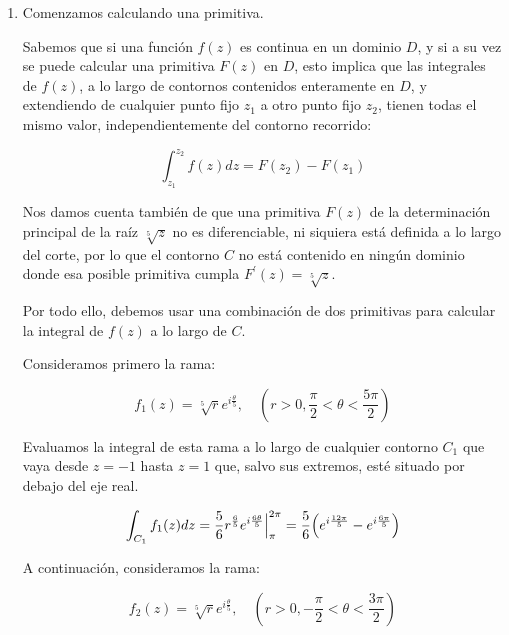 \begin{enumerate}
    \vspace{20px}
    \item Comenzamos calculando una primitiva.

    Sabemos que si una función $f(z)$ es continua en un dominio $D$, y si a su vez se puede calcular una primitiva $F(z)$ en $D$,
    esto implica que las integrales de $f(z)$, a lo largo de contornos contenidos enteramente en $D$, y extendiendo de cualquier punto
    fijo $z_1$ a otro punto fijo $z_2$, tienen todas el mismo valor, independientemente del contorno recorrido:

    \begin{equation*}
        \int_{z_1}^{z_2} f(z)dz = F(z_2) - F(z_1)
    \end{equation*}

    Nos damos cuenta también de que una primitiva $F(z)$ de la determinación principal de la raíz $\sqrt[5]{z}$ no es diferenciable,
    ni siquiera está definida a lo largo del corte, por lo que el contorno $C$ no está contenido en ningún dominio donde
    esa posible primitiva cumpla $F^\prime(z) = \sqrt[5]{z}$.

    Por todo ello, debemos usar una combinación de dos primitivas para calcular la integral de $f(z)$ a lo largo de $C$.

    Consideramos primero la rama:

    \begin{equation*}
        f_1(z) = \sqrt[5]{r} e^{i\frac{\theta}{5}}, \hspace{12pt} (r> 0, \frac{\pi}{2} < \theta < \frac{5\pi}{2})
    \end{equation*}

    Evaluamos la integral de esta rama a lo largo de cualquier contorno $C_1$ que vaya desde $z = -1$ hasta $z = 1$ que,
    salvo sus extremos, esté situado por debajo del eje real.

    \begin{equation*}
        \int_{C_1} f_1(z) dz = \frac{5}{6} r^{\frac{6}{5}} e^{i\frac{6\theta}{5}} \Big|_\pi^{2\pi} =
        \frac{5}{6}\Bigl(e^{i\frac{12\pi}{5}} - e^{i\frac{6\pi}{5}} \Bigr)
    \end{equation*}

    A continuación, consideramos la rama:

    \begin{equation*}
        f_2(z) = \sqrt[5]{r} e^{i\frac{\theta}{5}}, \hspace{12pt} (r> 0, - \frac{\pi}{2} < \theta < \frac{3\pi}{2})
    \end{equation*}


\end{enumerate}
